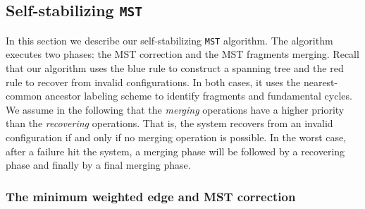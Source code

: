 \documentclass[11pt,a4paper]{article}
\newcommand{\MST}{\mbox{\tt MST}}
\begin{document}
\subsection{Self-stabilizing \MST}

In this section we describe our self-stabilizing \MST\/
algorithm. The algorithm executes two phases: the MST correction and
the MST fragments merging. Recall that our algorithm uses the blue rule to
construct a spanning tree and the red rule to recover from invalid configurations. 
In both cases, it uses the nearest-common ancestor labeling scheme to
identify fragments and fundamental cycles.
We assume in the following that the \textit{merging} operations have a higher priority
than the \textit{recovering} operations. That is, the system recovers
from an invalid configuration if and only if no merging operation is 
possible. In the worst case, after a failure hit the system, a
merging phase will be followed by a recovering phase and finally by a
final merging phase.

\subsubsection{The minimum weighted edge and MST correction}
\end{document}

